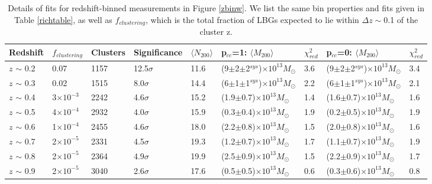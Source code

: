 \begin{landscape}
\begin{table}
  \centering
    \caption[Magnification Results for Redshift-Binned Clusters]{Details of fits for redshift-binned measurements in Figure \ref{zbinw}. We list the same bin properties and fits given in Table \ref{richtable}, as well as $f_{clustering}$, which is the total fraction of LBGs expected to lie within $\Delta z \sim$0.1 of the cluster z.}
    \label{ztable}
    \begin{tabular}{lllllllll}
      \hline
      Redshift & $f_{clustering}$ & Clusters & Significance & $\langle N_{200} \rangle$ & p$_{cc}$=1: $\langle M_{200} \rangle$ & $\chi^2_{red}$  & p$_{cc}$=0: $\langle M_{200} \rangle$ & $\chi^2_{red}$ \\ \hline
      $z$ $\sim$ 0.2 & 0.07 & 1157 & 12.5$\sigma$ & 11.6 & (9$\pm$2$\pm$2$^{sys}$)$\times10^{13} M_{\odot}$ & 3.6 & (9$\pm$2$\pm$2$^{sys}$)$\times10^{13} M_{\odot}$ & 3.4  \\
      $z$ $\sim$ 0.3 & 0.02 & 1515 & 8.0$\sigma$ & 14.4 & (6$\pm$1$\pm$1$^{sys}$)$\times10^{13} M_{\odot}$ & 2.2 & (6$\pm$1$\pm$1$^{sys}$)$\times10^{13} M_{\odot}$ & 2.1  \\
      $z$ $\sim$ 0.4 & 3$\times10^{-3}$ & 2242 & 4.6$\sigma$ & 15.2 & (1.9$\pm$0.7)$\times10^{13} M_{\odot}$ & 1.4 & (1.6$\pm$0.7)$\times10^{13} M_{\odot}$ & 1.6  \\
      $z$ $\sim$ 0.5 & 4$\times10^{-4}$ & 2932 & 4.0$\sigma$ & 15.9 & (0.3$\pm$0.4)$\times10^{13} M_{\odot}$ & 1.9 & (0.2$\pm$0.5)$\times10^{13} M_{\odot}$ & 1.9  \\
      $z$ $\sim$ 0.6 & 1$\times10^{-4}$ & 2455 & 4.6$\sigma$ & 18.0 & (2.2$\pm$0.8)$\times10^{13} M_{\odot}$ & 1.5 & (2.0$\pm$0.8)$\times10^{13} M_{\odot}$ & 1.6  \\
      $z$ $\sim$ 0.7 & 2$\times10^{-5}$ & 2331 & 4.5$\sigma$ & 19.3 & (1.2$\pm$0.7)$\times10^{13} M_{\odot}$ & 1.7 & (1.1$\pm$0.7)$\times10^{13} M_{\odot}$ & 1.9  \\
      $z$ $\sim$ 0.8 & 2$\times10^{-5}$ & 2364 & 4.9$\sigma$ & 19.9 & (2.5$\pm$0.9)$\times10^{13} M_{\odot}$ & 1.5 & (2.2$\pm$0.9)$\times10^{13} M_{\odot}$ & 1.7  \\ 
      $z$ $\sim$ 0.9 & 2$\times10^{-5}$ & 3040 & 2.6$\sigma$ & 17.6 & (0.5$\pm$0.5)$\times10^{13} M_{\odot}$ & 0.6 & (0.3$\pm$0.6)$\times10^{13} M_{\odot}$ & 0.8  \\
      \hline
    \end{tabular}
\end{table}
\end{landscape}


